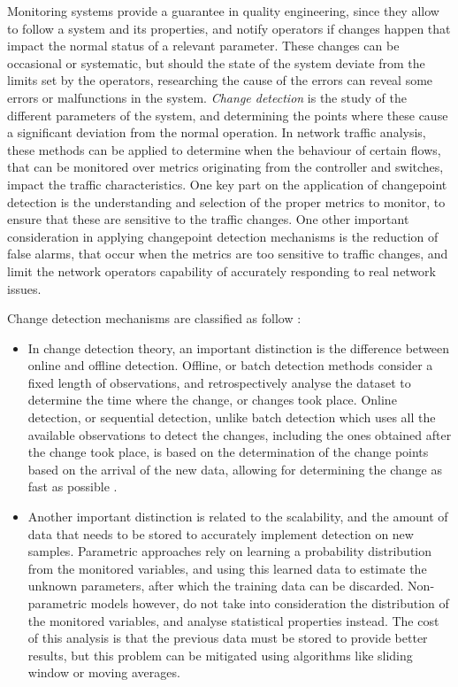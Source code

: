 \par Monitoring systems provide a guarantee in quality engineering, since they allow to follow a system and its properties, and notify operators if changes happen
that impact the normal status of a relevant parameter. These changes can be occasional or systematic, but should the state of the system deviate from the limits set
by the operators, researching the cause of the errors can reveal some errors or malfunctions in the system. \textit{Change detection} is the study of the different 
parameters of the system, and determining the points where these cause a significant deviation from the normal operation. In network traffic analysis, these methods
can be applied to determine when the behaviour of certain flows, that can be monitored over metrics originating from the controller and switches, impact the traffic
characteristics. One key part on the application of changepoint detection is the understanding and selection of the proper metrics to monitor, to ensure that these
are sensitive to the traffic changes. One other important consideration in applying changepoint detection mechanisms is the reduction of false alarms, that occur 
when the metrics are too sensitive to traffic changes, and limit the network operators capability of accurately responding to real network issues. 

\par Change detection mechanisms are classified as follow  \cite{munz_traffic_2010}:

\begin {itemize}
    \item In change detection theory, an important distinction is the difference between online and offline detection. Offline, or batch detection 
        methods consider a fixed length of observations, and retrospectively analyse the dataset to determine the time where the change, or changes took place. 
        Online detection, or sequential detection, unlike batch detection which uses all the available observations to detect the changes, including the
        ones obtained after the change took place, is based on the determination of the change points based on the arrival of the new data, allowing for determining
        the change as fast as possible \cite{ahmed_novel_2008}. 
    \item Another important distinction is related to the scalability, and the amount of data that needs to be stored to accurately implement
        detection on new samples. Parametric approaches rely on learning a probability distribution from the monitored variables, and using this learned data to 
        estimate the unknown parameters, after which the training data can be discarded. Non-parametric models however, do not take into consideration the
        distribution of the monitored variables, and analyse statistical properties instead. The cost of this analysis is that the previous data must be stored to
        provide better results, but this problem can be mitigated using algorithms like sliding window or moving averages.
\end {itemize}

